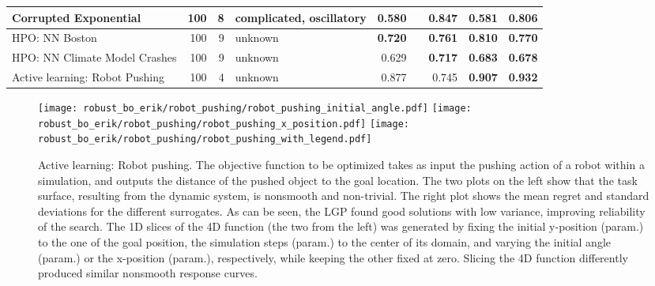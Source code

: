 \begin{table*}[t]
{\begin{tabular}{lrrlrr|rrr}
        Corrupted Exponential & 100 & 8 &   complicated, oscillatory          &               0.580 &&   \textbf{0.847} &          0.581 &    \textbf{0.806} \\
        \midrule
        HPO: NN Boston          & 100     & 9 &  unknown  &           \textbf{0.720} &&   \textbf{0.761} &      \textbf{0.810} &        \textbf{0.770} \\
        HPO: NN Climate Model Crashes & 100 & 9 &  unknown  &          0.629 &&   \textbf{0.717} &        \textbf{0.683} &      \textbf{0.678} \\
        Active learning: Robot Pushing & 100 & 4 &  unknown  &          0.877 &&   0.745 &        \textbf{0.907} &      \textbf{0.932} \\
        \bottomrule
    \end{tabular}
    }
    \medskip
\end{table*}

\begin{figure}[t]
    \centering
    \texttt{[image: robust\_bo\_erik/robot\_pushing/robot\_pushing\_initial\_angle.pdf]}
    \texttt{[image: robust\_bo\_erik/robot\_pushing/robot\_pushing\_x\_position.pdf]}
    \texttt{[image: robust\_bo\_erik/robot\_pushing/robot\_pushing\_with\_legend.pdf]}
    \caption{
    Active learning: Robot pushing.
    The objective function to be optimized takes as input the pushing action of a robot within a simulation,
    and outputs the distance of the pushed object to the goal location.
    The two plots on the left show that the task surface, resulting from the dynamic system, is nonsmooth and non-trivial.
    The right plot shows the mean regret and standard deviations for the different surrogates.
    As can be seen, the LGP found good solutions with low variance, improving reliability of the search.
    The 1D slices of the 4D function (the two from the left) was generated by fixing the initial y-position (param.) to the one of the goal position,
    the simulation steps (param.) to the center of its domain, and varying the initial angle (param.) or the x-position (param.), respectively,
    while keeping the other fixed at zero.
    Slicing the 4D function differently produced similar nonsmooth response curves.\\
    \label{fig:bayesian_optimization:real_world}
    }
\end{figure}

